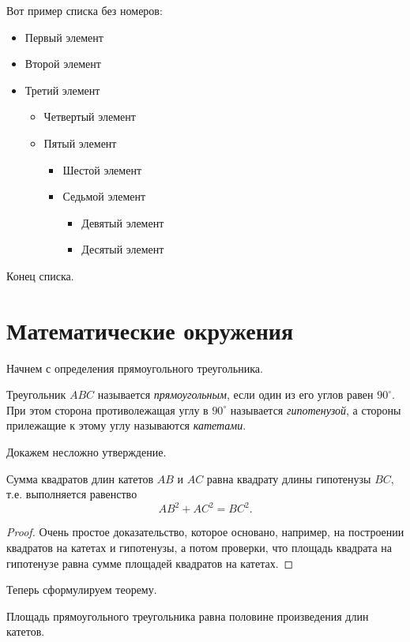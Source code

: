 \documentclass[12pt]{extreport}
\begin{document}
Вот пример списка без номеров:
\begin{itemize}
\item Первый элемент
\item Второй элемент
\item Третий элемент
\begin{itemize}
\item Четвертый элемент
\item Пятый элемент
\begin{itemize}
\item Шестой элемент
\item Седьмой элемент
\begin{itemize}
\item Девятый элемент
\item Десятый элемент
\end{itemize}
\end{itemize}
\end{itemize}
\end{itemize}
Конец списка.
\section{Математические окружения}
\label{sec:org3afa203}

Начнем с определения прямоугольного треугольника.

\begin{definition}\label{def:traingle1}
Треугольник \(ABC\) называется \emph{прямоугольным}, если один из его углов равен \(90^{\circ}\).
При этом сторона противолежащая углу в \(90^{\circ}\) называется \emph{гипотенузой}, а стороны прилежащие к этому углу называются \emph{катетами}.
\end{definition}

Докажем несложно утверждение.
\begin{proposition}\label{prop:triangle}
Сумма квадратов длин катетов \(AB\) и \(AC\) равна квадрату длины гипотенузы \(BC\), т.е. выполняется равенство
\[ AB^{2}+AC^{2} = BC^{2}. \]
\end{proposition}
\begin{proof}
Очень простое доказательство, которое основано, например, на построении квадратов на катетах и гипотенузы, а потом проверки, что площадь квадрата на гипотенузе равна сумме площадей квадратов на катетах.
\end{proof}

Теперь сформулируем теорему.
\begin{theorem}\label{thm:triangle}
Площадь прямоугольного треугольника равна половине произведения длин катетов.
\end{theorem}
\end{document}
